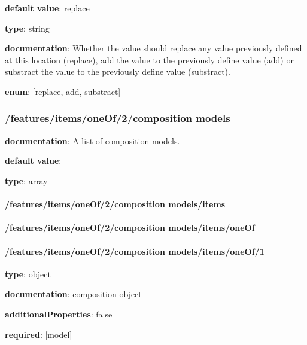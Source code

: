 \begin{itemized}
\item {\bf default value}: replace
\item {\bf type}: string
\item {\bf documentation}: Whether the value should replace any value previously defined at this location (replace), add the value to the previously define value (add) or substract the value to the previously define value (substract).
\item {\bf enum}: [replace, add, substract]\end{itemized}\subsubsection{/features/items/oneOf/2/composition models} \begin{itemized}
\item {\bf documentation}: A list of composition models.
\item {\bf default value}: 
\item {\bf type}: array
\paragraph{/features/items/oneOf/2/composition models/items} \begin{itemized}
\end{itemized}\end{itemized}\paragraph{/features/items/oneOf/2/composition models/items/oneOf} \begin{itemized}
\end{itemized}\paragraph{/features/items/oneOf/2/composition models/items/oneOf/1} \begin{itemized}
\item {\bf type}: object
\item {\bf documentation}: composition object
\item {\bf additionalProperties}: false
\item {\bf required}: [model]\end{itemized}
